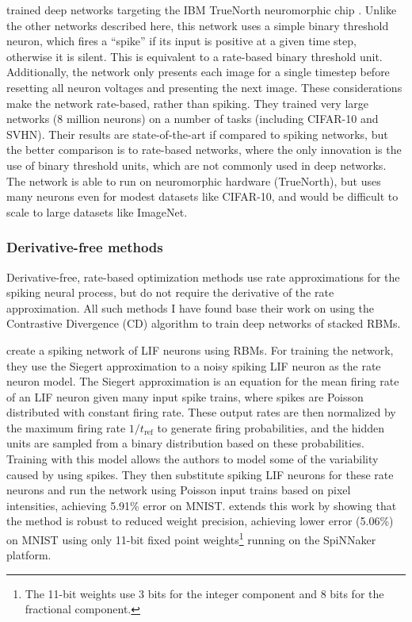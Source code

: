 \textcite{Esser2016} trained deep networks
targeting the IBM TrueNorth neuromorphic chip \parencite{Merolla2014}.
Unlike the other networks described here,
this network uses a simple binary threshold neuron,
which fires a ``spike'' if its input is positive at a given time step,
otherwise it is silent.
This is equivalent to a rate-based binary threshold unit.
Additionally, the network only presents each image for a single timestep
before resetting all neuron voltages and presenting the next image.
These considerations make the network rate-based, rather than spiking.
They trained very large networks (8 million neurons)
on a number of tasks (including CIFAR-10 and SVHN).
Their results are state-of-the-art if compared to spiking networks,
but the better comparison is to rate-based networks,
where the only innovation is the use of binary threshold units,
which are not commonly used in deep networks.
The network is able to run on neuromorphic hardware (TrueNorth),
but uses many neurons even for modest datasets like CIFAR-10,
and would be difficult to scale to large datasets like ImageNet.


\subsubsection{Derivative-free methods}

Derivative-free, rate-based optimization methods
use rate approximations for the spiking neural process,
but do not require the derivative of the rate approximation.
All such methods I have found base their work on
using the Contrastive Divergence (CD) algorithm \parencite{Hinton2006a}
to train deep networks of stacked RBMs.

\textcite{OConnor2013} create a spiking network of LIF neurons using RBMs.
For training the network,
they use the Siegert approximation to a noisy spiking LIF neuron
as the rate neuron model.
The Siegert approximation is an equation for the mean firing rate of an LIF neuron
given many input spike trains,
where spikes are Poisson distributed with constant firing rate.
These output rates are then normalized by the maximum firing rate $1/t_\text{ref}$
to generate firing probabilities,
and the hidden units are sampled from a binary distribution based on these probabilities.
Training with this model allows the authors to
model some of the variability caused by using spikes.
They then substitute spiking LIF neurons for these rate neurons
and run the network using Poisson input trains based on pixel intensities,
achieving 5.91\% error on MNIST.
\textcite{Stromatias2015} extends this work by showing that the method
is robust to reduced weight precision,
achieving lower error (5.06\%) on MNIST
using only 11-bit fixed point weights\footnote{
  The 11-bit weights use 3 bits for the integer component
  and 8 bits for the fractional component.}
running on the SpiNNaker platform.

